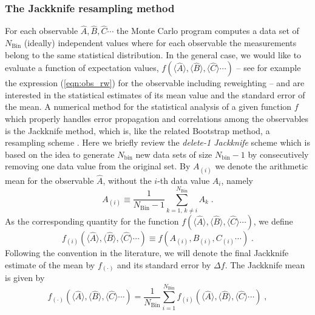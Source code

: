 \subsubsection{The Jackknife resampling method}\label{sec:jack}
%
For each observable $\hat{A}, \hat{B},\hat{C} \cdots$ the Monte Carlo program computes a data set of $N_{\text{Bin}}$ (ideally) independent values where for each observable the measurements belong to the same  statistical distribution.  In the general case, we would like to evaluate a function of expectation values, $f(\langle \hat{A} \rangle, \langle \hat{B} \rangle, \langle \hat{C} \rangle  \cdots)$ --
see for example the expression (\ref{eqn:obs_rw}) for the observable including reweighting --
and are interested in the statistical estimates of its mean value  and the standard error of the mean.
A numerical method for the statistical analysis of a given function $f$ which properly handles error propagation and correlations among the observables is the Jackknife method, which is, like the related Bootstrap method, a resampling scheme \cite{efron1981}.
Here we briefly review the \textit{delete-1 Jackknife} scheme which is based on the idea to generate $N_{\text{bin}}$ new data sets of size $N_{\text{bin}}-1$ by consecutively removing one data value from the original set. By $A_{(i)}$ we denote the arithmetic mean for the observable $\hat{A}$, without the $i$-th data value $A_{i}$, namely
\begin{equation}
A_{(i)} \equiv \frac{1}{N_{\text{Bin}}-1} \sum\limits_{k=1,\,k\neq i}^{N_{\text{Bin}}} A_{k}\;.
\end{equation}
As the corresponding quantity for  the function $f(\langle \hat{A} \rangle, \langle \hat{B} \rangle, \langle \hat{C} \rangle  \cdots)$, we define 
\begin{equation}
f_{(i)}(\langle \hat{A} \rangle, \langle \hat{B} \rangle, \langle \hat{C} \rangle  \cdots) \equiv
f( A_{(i)}, B_{(i)},C_{(i)}\cdots)\;.
\end{equation}
Following the convention in the literature, we will denote the final Jackknife estimate of the mean by $f_{(\cdot)}$ and its standard error by $\Delta f$. The Jackknife mean is  given by
\begin{equation}
\label{eqn:jack_mean}
f_{(\cdot)}(\langle \hat{A} \rangle, \langle \hat{B} \rangle, \langle \hat{C} \rangle  \cdots) =
\frac{1}{N_{\text{Bin}}}\sum\limits_{i=1}^{N_{\text{Bin}}} f_{(i)}(\langle \hat{A} \rangle, \langle \hat{B} \rangle, \langle \hat{C} \rangle  \cdots)\;,
\end{equation}
